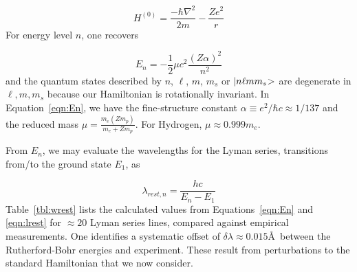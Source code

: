 \documentclass[graybox]{svmult}
\def\ohf{\frac{1}{2}}
\def\ket#1{{|#1\negmedspace>}}
\begin{document}
\begin{equation}
H^{(0)} = \frac{-\hbar \nabla^2}{2m} - \frac{Z e^2}{r}
\end{equation}
For energy level $n$, one recovers

\begin{equation}
E_n = -\ohf \mu c^2 \frac{(Z \alpha)^2}{n^2}
\label{eqn:En}
\end{equation}
and the quantum states described by $n$, $\ell$, $m$, $m_s$
or $\ket{n \ell m m_s}$ 
are degenerate in $\ell, m, m_s$
because our Hamiltonian is rotationally invariant.
In Equation~\ref{eqn:En}, we have
the fine-structure constant 
$\alpha \equiv e^2/\hbar c \approx 1/137$ and
the reduced mass $\mu = \frac{m_e (Z m_p)}{m_e + Z m_p}$.
For Hydrogen, $\mu \approx 0.999 m_e$. 

From $E_n$, we may evaluate the wavelengths for the Lyman
series, transitions from/to the ground state $E_1$, as

\begin{equation}
\lambda_{rest,n} = \frac{hc}{E_n - E_1}
\label{eqn:lrest}
\end{equation}
Table~\ref{tbl:wrest} lists the calculated values 
from Equations~\ref{eqn:En} and \ref{eqn:lrest}
for $\approx 20$ Lyman series lines, compared against
empirical measurements.  One identifies a systematic
offset of $\delta\lambda \approx 0.015$\AA\ between
the Rutherford-Bohr energies and experiment.
These result from perturbations to the 
standard Hamiltonian that we now consider.
\end{document}
